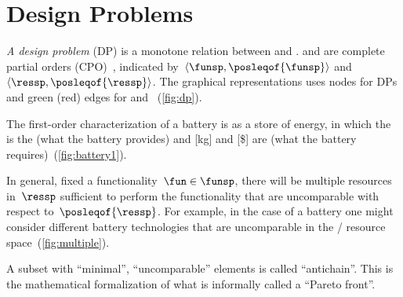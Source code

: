 \section{Design Problems}

\emph{A design problem} (DP) is a monotone relation between \emph{}
and \emph{}.  and 
are complete partial orders (CPO)~\cite{davey02}, indicated by~$\langle\funsp,\posleqof{\funsp}\rangle$
and~$\langle\ressp,\posleqof{\ressp}\rangle$.
The graphical representations
uses nodes for DPs and green (red) edges for  and
~(\cref{fig:dp}).

\begin{example}
	The first-order characterization of a battery is as a store of energy,
	in which the  is the  (what
	the battery provides) and  {[}kg{]} and  {[}\${]}
	are  (what the battery requires)~(\cref{fig:battery1}).
\end{example}

\noindent In general, fixed a functionality~$\fun\in\funsp$, there
will be multiple resources in~$\ressp$ sufficient to perform the
functionality that are uncomparable with respect to~$\posleqof{\ressp}$.
For example, in the case of a battery one might consider different
battery technologies that are uncomparable in the /
resource space~(\cref{fig:multiple}).


A subset with ``minimal'', ``uncomparable'' elements is called
``antichain''.
This is the mathematical formalization of what is
informally called a ``Pareto front''.

